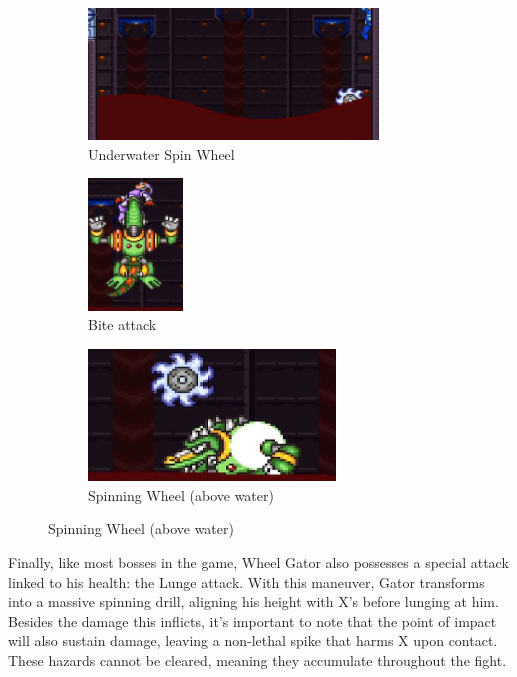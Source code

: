 \begin{figure}[htp]
	\centering
	\begin{subfigure}{\linewidth}
		\centering
		\includegraphics[height=3.5cm]{figures/X2/Wheel_gator/Gator_Spinning_wheel.png}
		\caption{Underwater Spin Wheel}
	\end{subfigure}
	\begin{subfigure}{0.2\linewidth}
		\centering
		\includegraphics[height=3.5cm]{figures/X2/Wheel_gator/Gator_bite.png}
		\caption{Bite attack}
	\end{subfigure}
	\begin{subfigure}{0.65\linewidth}
		\centering
		\includegraphics[height=3.5cm]{figures/X2/Wheel_gator/Gator_spinning_wheel_2.png}
		\caption{Spinning Wheel (above water)}
	\end{subfigure}
\end{figure}
Finally, like most bosses in the game, Wheel Gator also possesses a special attack linked to his health: the Lunge attack. With this maneuver, Gator transforms into a massive spinning drill, aligning his height with X's before lunging at him. Besides the damage this inflicts, it's important to note that the point of impact will also sustain damage, leaving a non-lethal spike that harms X upon contact. These hazards cannot be cleared, meaning they accumulate throughout the fight.


